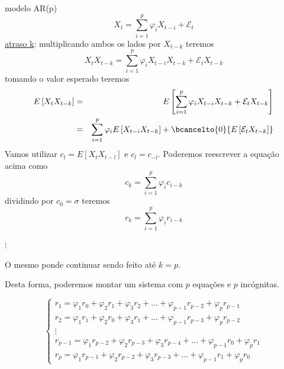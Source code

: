 \begin{frame}[allowframebreaks]
  

  \framebreak
  modelo AR(p)
  \begin{equation}
  X_t = \sum_{i=1}^p \varphi_i X_{t-i} + \mathcal{E}_t
  \end{equation}
  \underline{atraso k}:
  multiplicando ambos os lados por $X_{t-k}$ teremos
  \begin{equation}
  X_t X_{t-k} = \sum_{i=1}^p \varphi_i X_{t-i} X_{t-k} + \mathcal{E}_t X_{t-k}
  \end{equation}
  tomando o valor esperado teremos
  \begin{eqnarray}
  E\left[ X_t X_{t-k} \right] &=& E\left[ \sum_{i=1}^p \varphi_i X_{t-i} X_{t-k} + \mathcal{E}_t X_{t-k} \right] \nonumber \\
  &=& \sum_{i=1}^p \varphi_i E\left[ X_{t-i} X_{t-k} \right] + \bcancelto{0}{E\left[ \mathcal{E}_t X_{t-k} \right]} 
  \end{eqnarray} 
  Vamos utilizar $c_l = E\left[ X_{t} X_{t-l} \right]$ e $c_l = c_{-l}$. Poderemos reescrever a equação acima como
  \begin{equation}
        c_k = \sum_{i=1}^p \varphi_i c_{i-k}
  \end{equation}
  dividindo por $c_0 = \sigma$ teremos
  \begin{equation}
        r_k = \sum_{i=1}^p \varphi_i r_{i-k}
  \end{equation}
  
  \framebreak
  $\vdots$

  \vspace{3ex}
  O mesmo ponde continuar sendo feito até $k=p$.
  
  Desta forma, poderemos montar um sistema com $p$ equações e $p$ incógnitas.

  \framebreak
  \begin{equation}
        \begin{cases} 
        r_1 = \varphi_1 r_0 + \varphi_2 r_1 + \varphi_3 r_2 + \ldots + \varphi_{p-1} r_{p-2} + \varphi_{p} r_{p-1} \\ 
        r_2 = \varphi_1 r_1 + \varphi_2 r_0 + \varphi_3 r_1 + \ldots + \varphi_{p-1} r_{p-3} + \varphi_{p} r_{p-2} \\
        \vdots \\
        r_{p-1} = \varphi_1 r_{p-2} + \varphi_2 r_{p-3} + \varphi_3 r_{p-4} + \ldots + \varphi_{p-1} r_{0} + \varphi_{p} r_{1} \\
        r_p = \varphi_1 r_{p-1} + \varphi_2 r_{p-2} + \varphi_3 r_{p-3} + \ldots + \varphi_{p-1} r_{1} + \varphi_{p} r_{0} 
         \end{cases}
  \end{equation}
  

\end{frame}
